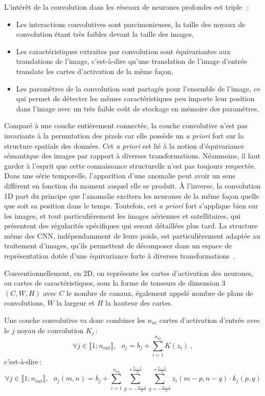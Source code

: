 L'intérêt de la convolution dans les réseaux de neurones profondes est triple~\cite{goodfellow_deep_2016}\,:
\begin{itemize}
  \item Les interactions convolutives sont parcimonieuses, la taille des noyaux de convolution étant très faibles devant la taille des images,
  \item Les caractéristiques extraites par convolution sont équivariantes aux translations de l'image, c'est-à-dire qu'une translation de l'image d'entrée translate les cartes d'activation de la même façon,
  \item Les paramètres de la convolution sont partagés pour l'ensemble de l'image, ce qui permet de détecter les mêmes caractéristiques peu importe leur position dans l'image avec un très faible coût de stockage en mémoire des paramètres.
\end{itemize}
Comparé à une couche entièrement connectée, la couche convolutive n'est pas invariante à la permutation des pixels car elle possède un \emph{a priori} fort sur la structure spatiale des données. Cet \emph{a priori} est lié à la notion d'équivariance sémantique des images par rapport à diverses transformations. Néanmoins, il faut garder à l'esprit que cette connaissance structurelle n'est pas toujours respectée. Dans une série temporelle, l'apparition d'une anomalie peut avoir un sens différent en fonction du moment auquel elle se produit. À l'inverse, la convolution 1D part du principe que l'anomalie excitera les neurones de la même façon quelle que soit sa position dans le temps. Toutefois, cet \emph{a priori} fort s'applique bien sur les images, et tout particulièrement les images aériennes et satellitaires, qui présentent des régularités spécifiques qui seront détaillées plus tard. La structure même des \gls{CNN}, indépendamment de leurs poids, est particulièrement adaptée au traitement d'images, qu'ils permettent de décomposer dans un espace de représentation dotée d'une équivariance forte à diverses transformations~\cite{ulyanov_deep_2017}.

Conventionnellement, en 2D, on représente les cartes d'activation des neurones, ou cartes de caractéristiques, sous la forme de tenseurs de dimension 3 $(C, W, H)$ avec $C$ le nombre de canaux, également appelé nombre de plans de convolutions, $W$ la largeur et $H$ la hauteur des cartes.

Une couche convolutive va donc combiner les $n_{in}$ cartes d'activation d'entrée avec le $j$\ieme{} noyau de convolution $K_j$\,:
$$\forall j \in \llbracket 1;n_{out} \rrbracket,~~~o_j = b_j + \sum_{i=1}^{n_{in}} K(z_i)~,$$ c'est-à-dire\,:
$$\forall j \in \llbracket 1;n_{out} \rrbracket,~~~o_j(m, n) = b_j + \sum_{i=1}^{n_{in}} \sum_{p=-\frac{k-1}{2}}^{+\frac{k-1}{2}} \sum_{q=-\frac{k-1}{2}}^{+\frac{k-1}{2}} z_i(m - p, n - q) \cdot k_j(p, q)$$


